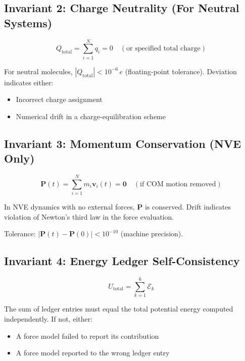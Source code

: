 \documentclass[11pt]{article}
\begin{document}
\subsection{Invariant 2: Charge Neutrality (For Neutral Systems)}

\begin{equation}
Q_{\text{total}} = \sum_{i=1}^{N} q_i = 0 \quad (\text{or specified total charge})
\end{equation}

For neutral molecules, $|Q_{\text{total}}| < 10^{-6}\,e$ (floating-point tolerance). Deviation indicates either:
\begin{itemize}
\item Incorrect charge assignment
\item Numerical drift in a charge-equilibration scheme
\end{itemize}

\subsection{Invariant 3: Momentum Conservation (NVE Only)}

\begin{equation}
\mathbf{P}(t) = \sum_{i=1}^{N} m_i \mathbf{v}_i(t) = \mathbf{0} \quad (\text{if COM motion removed})
\end{equation}

In NVE dynamics with no external forces, $\mathbf{P}$ is conserved. Drift indicates violation of Newton's third law in the force evaluation.

Tolerance: $|\mathbf{P}(t) - \mathbf{P}(0)| < 10^{-10}$ (machine precision).

\subsection{Invariant 4: Energy Ledger Self-Consistency}

\begin{equation}
U_{\text{total}} = \sum_{k=1}^{6} \mathcal{E}_k
\end{equation}

The sum of ledger entries must equal the total potential energy computed independently. If not, either:
\begin{itemize}
\item A force model failed to report its contribution
\item A force model reported to the wrong ledger entry
\end{itemize}
\end{document}
